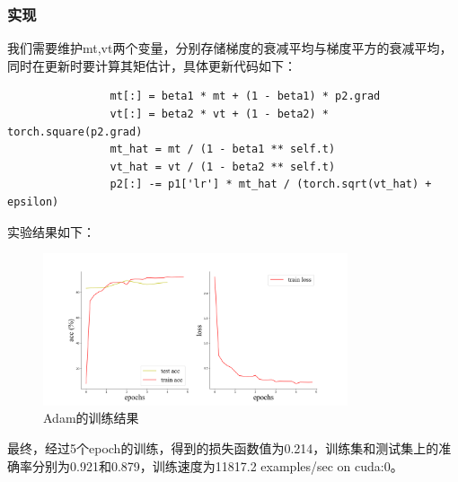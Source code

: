 \documentclass[10.5pt,a4paper]{article}%
\begin{document}
            \subsubsection{实现}
            我们需要维护mt,vt两个变量，分别存储梯度的衰减平均与梯度平方的衰减平均，同时在更新时要计算其矩估计，具体更新代码如下：
            \begin{lstlisting}
                mt[:] = beta1 * mt + (1 - beta1) * p2.grad
                vt[:] = beta2 * vt + (1 - beta2) * torch.square(p2.grad)
                mt_hat = mt / (1 - beta1 ** self.t)
                vt_hat = vt / (1 - beta2 ** self.t)
                p2[:] -= p1['lr'] * mt_hat / (torch.sqrt(vt_hat) + epsilon)
            \end{lstlisting}\par
            实验结果如下：
            \begin{figure}[H]
            \centering
                \includegraphics[width=0.8\textwidth]{imgs_5e/Adam.png}
              \caption{Adam的训练结果}
              \label{fig:adam}
            \end{figure}  
            最终，经过5个epoch的训练，得到的损失函数值为0.214，训练集和测试集上的准确率分别为0.921和0.879，训练速度为11817.2 examples/sec on cuda:0。\par
\end{document}
